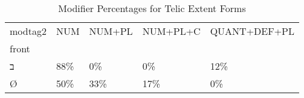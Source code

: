 \begin{table}[htbp!]
\centering
\caption{Modifier Percentages for Telic Extent Forms}
\label{table:telext_mod_pc}
\begin{tabular}{lllll}
\toprule
modtag2 &  NUM & NUM+PL & NUM+PL+C & QUANT+DEF+PL \\
front &      &        &          &              \\
\midrule
ב     &  88\% &     0\% &       0\% &          12\% \\
Ø     &  50\% &    33\% &      17\% &           0\% \\
\bottomrule
\end{tabular}
\end{table}
